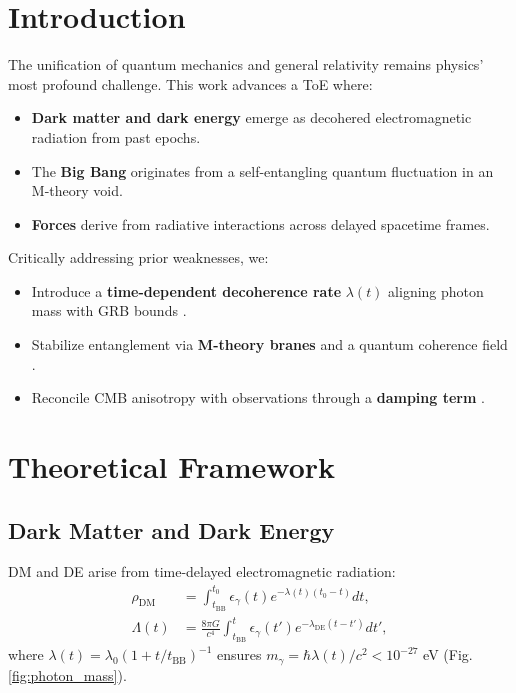 \documentclass[12pt, a4paper]{article}
\begin{document}
\section{Introduction}
\label{sec:intro}
The unification of quantum mechanics and general relativity remains physics' most profound challenge. This work advances a ToE where:
\begin{itemize}
\item \textbf{Dark matter and dark energy} emerge as decohered electromagnetic radiation from past epochs.
\item The \textbf{Big Bang} originates from a self-entangling quantum fluctuation in an M-theory void.
\item \textbf{Forces} derive from radiative interactions across delayed spacetime frames.
\end{itemize}
Critically addressing prior weaknesses, we:
\begin{itemize}
\item Introduce a \textbf{time-dependent decoherence rate} \(\lambda(t)\) aligning photon mass with GRB bounds \citep{GRB2023}.
\item Stabilize entanglement via \textbf{M-theory branes} and a quantum coherence field \citep{Witten2001}.
\item Reconcile CMB anisotropy with observations through a \textbf{damping term} \citep{Planck2020}.
\end{itemize}

\section{Theoretical Framework}
\subsection{Dark Matter and Dark Energy}
DM and DE arise from time-delayed electromagnetic radiation:
\begin{align}
\rho_{\text{DM}} &= \int_{t_{\text{BB}}}^{t_0} \epsilon_{\gamma}(t) e^{-\lambda(t)(t_0 - t)} dt, \label{eq:dm} \\
\Lambda(t) &= \frac{8\pi G}{c^4} \int_{t_{\text{BB}}}^{t} \epsilon_{\gamma}(t') e^{-\lambda_{\text{DE}}(t - t')} dt', \label{eq:de}
\end{align}
where \(\lambda(t) = \lambda_0 \left(1 + t/t_{\text{BB}}\right)^{-1}\) ensures \(m_\gamma = \hbar \lambda(t)/c^2 < 10^{-27}\) eV (Fig. \ref{fig:photon_mass}).
\end{document}
